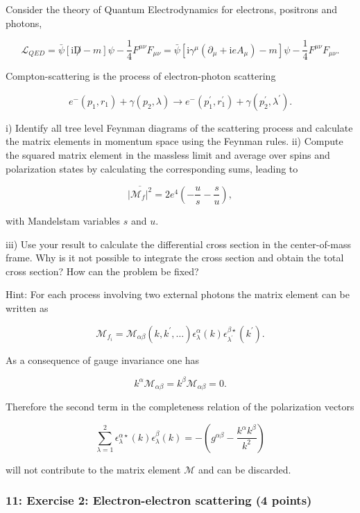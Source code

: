 \documentclass[10pt, letterpaper]{article}
\begin{document}
{\color{blue}
Consider the theory of Quantum Electrodynamics for electrons, positrons and photons,

$$
\mathcal{L}_{Q E D}=\bar{\psi}[\mathrm{i} \not D-m] \psi-\frac{1}{4} F^{\mu \nu} F_{\mu \nu}=\bar{\psi}\left[\mathrm{i} \gamma^\mu\left(\partial_\mu+\mathrm{i} e A_\mu\right)-m\right] \psi-\frac{1}{4} F^{\mu \nu} F_{\mu \nu} .
$$


Compton-scattering is the process of electron-photon scattering

$$
e^{-}\left(p_1, r_1\right)+\gamma\left(p_2, \lambda\right) \rightarrow e^{-}\left(p_1^{\prime}, r_1^{\prime}\right)+\gamma\left(p_2^{\prime}, \lambda^{\prime}\right) .
$$

i) Identify all tree level Feynman diagrams of the scattering process and calculate the matrix elements in momentum space using the Feynman rules.
ii) Compute the squared matrix element in the massless limit and average over spins and polarization states by calculating the corresponding sums, leading to

$$
\overline{\left|\mathcal{M}_f\right|^2}=2 e^4\left(-\frac{u}{s}-\frac{s}{u}\right),
$$

with Mandelstam variables $s$ and $u$.


iii) Use your result to calculate the differential cross section in the center-of-mass frame. Why is it not possible to integrate the cross section and obtain the total cross section? How can the problem be fixed?

Hint: For each process involving two external photons the matrix element can be written as

$$
\mathcal{M}_{f_i}=\mathcal{M}_{\alpha \beta}\left(k, k^{\prime}, \ldots\right) \epsilon_\lambda^\alpha(k) \epsilon_{\lambda^{\prime}}^{\beta \star}\left(k^{\prime}\right) .
$$


As a consequence of gauge invariance one has

$$
k^\alpha \mathcal{M}_{\alpha \beta}=k^\beta \mathcal{M}_{\alpha \beta}=0 .
$$


Therefore the second term in the completeness relation of the polarization vectors

$$
\sum_{\lambda=1}^2 \epsilon_\lambda^{\alpha \star}(k) \epsilon_\lambda^\beta(k)=-\left(g^{\alpha \beta}-\frac{k^\alpha k^\beta}{k^2}\right)
$$

will not contribute to the matrix element $\mathcal{M}$ and can be discarded.
}


\subsubsection{11: Exercise 2: Electron-electron scattering (4 points)}
\end{document}
